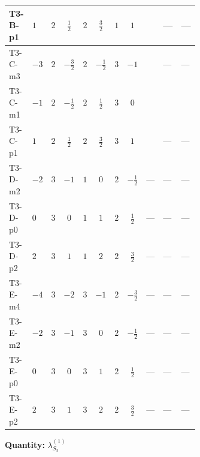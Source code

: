 \documentclass[8pt]{article}
\begin{document}
\begin{landscape}
\begin{longtable}{@{}llcccccc >{\raggedright\arraybackslash}p{0.21\linewidth} >{\raggedright\arraybackslash}p{0.21\linewidth} >{\raggedright\arraybackslash}p{0.21\linewidth}@{}}
\midrule
T3-B-p1 & $1$ & $2$ & $\frac{1}{2}$ & $2$ & $\frac{3}{2}$ & $1$ & $1$ & \scriptsize\adjustbox{max width=\linewidth}{$\begin{gathered} +\frac{{\lambda_{HS_2}^{(A)}}^2}{4}\end{gathered}$} & --- & --- \\
\midrule
T3-C-m3 & $-3$ & $2$ & $-\frac{3}{2}$ & $2$ & $-\frac{1}{2}$ & $3$ & $-1$ & \scriptsize\adjustbox{max width=\linewidth}{$\begin{gathered} +\frac{{\lambda_{HS_2}^{(A)}}^2}{4}\end{gathered}$} & --- & --- \\
\midrule
T3-C-m1 & $-1$ & $2$ & $-\frac{1}{2}$ & $2$ & $\frac{1}{2}$ & $3$ & $0$ & \scriptsize\adjustbox{max width=\linewidth}{$\begin{gathered} +\frac{{\lambda_{HS_2}^{(A)}}^2}{4}\end{gathered}$} & \scriptsize\adjustbox{max width=\linewidth}{$\begin{gathered} {\lambda_{10}} (3 \operatorname{Tr}\!\left({y_1}\,\left({y_2}\right)^{\dagger}\right)+24 \left({\lambda_{10}}\right)^{*})\end{gathered}$} & \scriptsize\adjustbox{max width=\linewidth}{$\begin{gathered} +3 \left({\lambda_{10}}\right)^{*} \operatorname{Tr}\!\left({y_2}\,\left({y_1}\right)^{\dagger}\right)\end{gathered}$} \\
\midrule
T3-C-p1 & $1$ & $2$ & $\frac{1}{2}$ & $2$ & $\frac{3}{2}$ & $3$ & $1$ & \scriptsize\adjustbox{max width=\linewidth}{$\begin{gathered} +\frac{{\lambda_{HS_2}^{(A)}}^2}{4}\end{gathered}$} & --- & --- \\
\midrule
T3-D-m2 & $-2$ & $3$ & $-1$ & $1$ & $0$ & $2$ & $-\frac{1}{2}$ & --- & --- & --- \\
\midrule
T3-D-p0 & $0$ & $3$ & $0$ & $1$ & $1$ & $2$ & $\frac{1}{2}$ & --- & --- & --- \\
\midrule
T3-D-p2 & $2$ & $3$ & $1$ & $1$ & $2$ & $2$ & $\frac{3}{2}$ & --- & --- & --- \\
\midrule
T3-E-m4 & $-4$ & $3$ & $-2$ & $3$ & $-1$ & $2$ & $-\frac{3}{2}$ & --- & --- & --- \\
\midrule
T3-E-m2 & $-2$ & $3$ & $-1$ & $3$ & $0$ & $2$ & $-\frac{1}{2}$ & --- & --- & --- \\
\midrule
T3-E-p0 & $0$ & $3$ & $0$ & $3$ & $1$ & $2$ & $\frac{1}{2}$ & --- & --- & --- \\
\midrule
T3-E-p2 & $2$ & $3$ & $1$ & $3$ & $2$ & $2$ & $\frac{3}{2}$ & --- & --- & --- \\
\midrule
\bottomrule
\end{longtable}
\clearpage
\noindent\textbf{Quantity: }$\lambda_{S_2}^{(1)}$\par\smallskip

\end{landscape}
\end{document}

